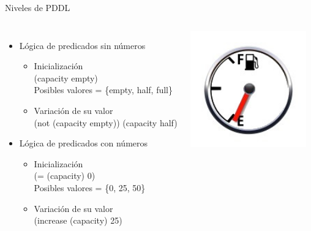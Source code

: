 \documentclass{beamer}
\begin{document}
\begin{frame}{Niveles de PDDL}
    \begin{columns}
    \begin{itemize}
        \item Lógica de predicados sin números \\
        \begin{itemize}
            \item Inicialización \\
            (capacity empty) \\ Posibles valores = \{empty, half, full\}
            \item Variación de su valor \\
            (not (capacity empty)) (capacity half)
        \end{itemize}
        
        \item Lógica de predicados con números
        \begin{itemize}
            \item Inicialización \\
            (= (capacity) 0) \\ Posibles valores  = \{0, 25, 50\}
            \item Variación de su valor \\
            (increase (capacity) 25)
        \end{itemize}
    \end{itemize}
    \includegraphics[width=5cm,height=5cm]{fuel}
    \end{columns}
\end{frame}

\end{document}
